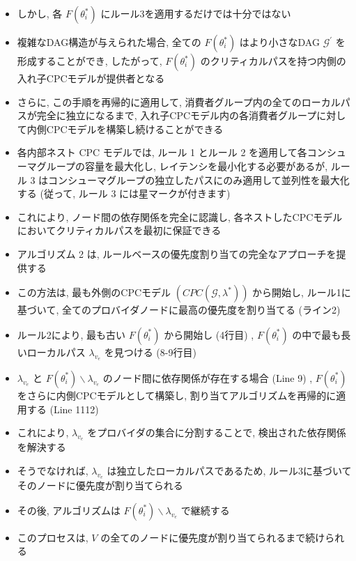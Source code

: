 \begin{frame}{}
    \begin{itemize}
        \item しかし, 各 $F\left(\theta_{i}^{*}\right)$ にルール3を適用するだけでは十分ではない
        \item 複雑なDAG構造が与えられた場合, 全ての $F\left(\theta_{i}^{*}\right)$ はより小さなDAG $\mathcal{G}^{\prime}$ を形成することができ, したがって, $F\left(\theta_{i}^{*}\right)$ のクリティカルパスを持つ内側の入れ子CPCモデルが提供者となる
        \item さらに, この手順を再帰的に適用して, 消費者グループ内の全てのローカルパスが完全に独立になるまで, 入れ子CPCモデル内の各消費者グループに対して内側CPCモデルを構築し続けることができる
        \item 各内部ネスト CPC モデルでは, ルール 1 とルール 2 を適用して各コンシューマグループの容量を最大化し, レイテンシを最小化する必要があるが, ルール 3 はコンシューマグループの独立したパスにのみ適用して並列性を最大化する (従って, ルール 3 には星マークが付きます)
        \item これにより, ノード間の依存関係を完全に認識し, 各ネストしたCPCモデルにおいてクリティカルパスを最初に保証できる
    \end{itemize}
\end{frame}

\begin{frame}{}
    \begin{itemize}
        \item アルゴリズム 2 は, ルールベースの優先度割り当ての完全なアプローチを提供する
        \item この方法は, 最も外側のCPCモデル $\left(C P C\left(\mathcal{G}, \lambda^{*}\right)\right)$ から開始し, ルール1に基づいて, 全てのプロバイダノードに最高の優先度を割り当てる (ライン2)
        \item ルール2により, 最も古い $F\left(\theta_{i}^{*}\right)$ から開始し (4行目) , $F\left(\theta_{i}^{*}\right)$ の中で最も長いローカルパス $\lambda_{v_{e}}$ を見つける (8-9行目)
        \item $\lambda_{v_{e}}$ と $F\left(\theta_{i}^{*}\right) \backslash \lambda_{v_{e}}$ のノード間に依存関係が存在する場合 (Line 9) , $F\left(\theta_{i}^{*}\right)$ をさらに内側CPCモデルとして構築し, 割り当てアルゴリズムを再帰的に適用する (Line 1112)
        \item これにより, $\lambda_{v_{e}}$ をプロバイダの集合に分割することで, 検出された依存関係を解決する
        \item そうでなければ, $\lambda_{v_{e}}$ は独立したローカルパスであるため, ルール3に基づいてそのノードに優先度が割り当てられる
        \item その後, アルゴリズムは $F\left(\theta_{i}^{*}\right) \backslash \lambda_{v_{e}}$ で継続する
        \item このプロセスは, $V$ の全てのノードに優先度が割り当てられるまで続けられる
    \end{itemize}
\end{frame}

